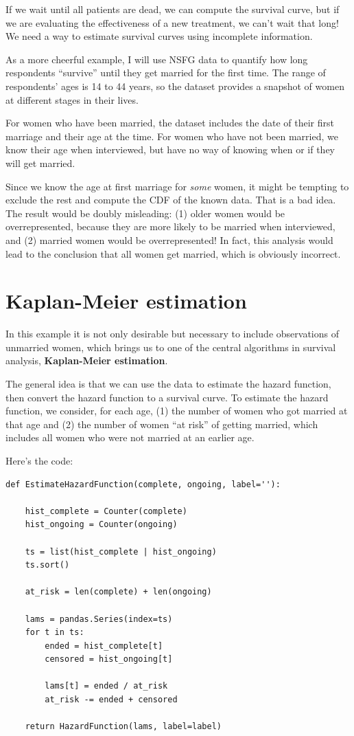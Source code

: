\documentclass[12pt]{book}
\begin{document}
If we wait until all patients are dead, we can compute the survival
curve, but if we are evaluating the effectiveness of a new treatment,
we can't wait that long!  We need a way to estimate survival curves
using incomplete information.

As a more cheerful example, I will use NSFG data to quantify how
long respondents ``survive'' until they get married for the
first time.  The range of respondents' ages is 14 to 44 years, so
the dataset provides a snapshot of women at different stages in their
lives.

For women who have been married, the dataset includes the date
of their first marriage and their age at the time.
For women who have not been married, we know their age when interviewed,
but have no way of knowing when or if they will get married.

Since we know the age at first marriage for {\em some\/} women, it
might be tempting to exclude the rest and compute the CDF of
the known data.  That is a bad idea.  The result would
be doubly misleading: (1) older women would be overrepresented,
because they are more likely to be married when interviewed,
and (2) married women would be overrepresented!  In fact, this
analysis would lead to the conclusion that all women get married,
which is obviously incorrect.


\section{Kaplan-Meier estimation}

In this example it is not only desirable but necessary to include
observations of unmarried women, which brings us to one of the central
algorithms in survival analysis, {\bf Kaplan-Meier estimation}.

The general idea is that we can use the data to estimate the hazard
function, then convert the hazard function to a survival curve.
To estimate the hazard function, we consider, for each age,
(1) the number of women who got married at that age and (2) the number
of women ``at risk'' of getting married, which includes all women
who were not married at an earlier age.

Here's the code:

\begin{verbatim}
def EstimateHazardFunction(complete, ongoing, label=''):

    hist_complete = Counter(complete)
    hist_ongoing = Counter(ongoing)

    ts = list(hist_complete | hist_ongoing)
    ts.sort()

    at_risk = len(complete) + len(ongoing)

    lams = pandas.Series(index=ts)
    for t in ts:
        ended = hist_complete[t]
        censored = hist_ongoing[t]

        lams[t] = ended / at_risk
        at_risk -= ended + censored

    return HazardFunction(lams, label=label)
\end{verbatim}
\end{document}
